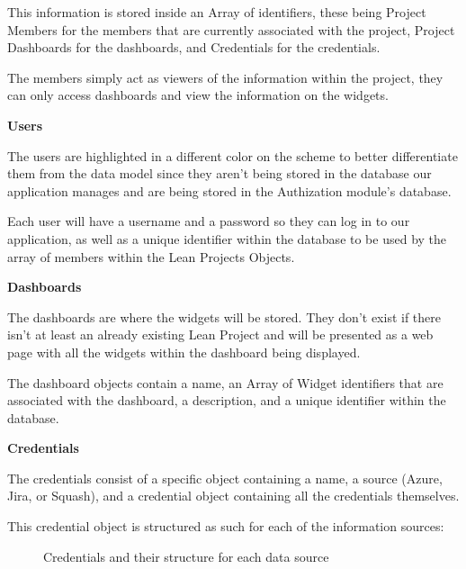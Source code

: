 \documentclass[a4paper,twoside,10pt]{report}
\begin{document}
This information is stored inside an Array of identifiers, these being Project Members for the members that are currently associated with the project, Project Dashboards for the dashboards, and Credentials for the credentials.

The members simply act as viewers of the information within the project, they can only access dashboards and view the information on the widgets.


\textbf{Users}

The users are highlighted in a different color on the scheme to better differentiate them from the data model since they aren't being stored in the database our application manages and are being stored in the Authization module's database.

Each user will have a username and a password so they can log in to our application, as well as a unique identifier within the database to be used by the array of members within the Lean Projects Objects.


\textbf{Dashboards}

The dashboards are where the widgets will be stored. They don't exist if there isn't at least an already existing Lean Project and will be presented as a web page with all the widgets within the dashboard being displayed.

The dashboard objects contain a name, an Array of Widget identifiers that are associated with the dashboard, a description, and a unique identifier within the database.


\textbf{Credentials}

The credentials consist of a specific object containing a name, a source (Azure, Jira, or Squash), and a credential object containing all the credentials themselves.

This credential object is structured as such for each of the information sources:

\begin{figure}[h!]
\center
\caption{Credentials and their structure for each data source}
\end{figure}
\end{document}
